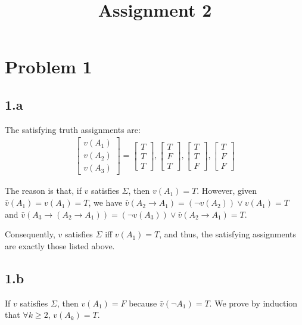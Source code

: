 \documentclass{article}
\title{\huge{\textbf{Assignment 2}}}
\author{\Chi{杨乐天}}
\date{}
\begin{document}
\maketitle

\section*{Problem 1}

\subsection*{1.a}

The satisfying truth assignments are:
\begin{align*}
\begin{bmatrix} v(A_1) \\ v(A_2) \\ v(A_3) \end{bmatrix}
=
\begin{bmatrix} T \\ T \\ T \end{bmatrix},
\begin{bmatrix} T \\ F \\ T \end{bmatrix},
\begin{bmatrix} T \\ T \\ F \end{bmatrix},
\begin{bmatrix} T \\ F \\ F \end{bmatrix}
\end{align*}

The reason is that, if $v$ satisfies $\Sigma$, then $v(A_1)=T$. However, given $\bar{v}(A_1)=v(A_1)=T$, we have $\bar{v}(A_2 \to A_1) = (\neg v(A_2)) \lor v(A_1)=T$ and $\bar{v}\left( A_3 \to \left( A_2 \to A_1 \right)\right) = (\neg v(A_3)) \lor \bar{v}(A_2 \to A_1) = T$.

Consequently, $v$ satisfies $\Sigma$ iff $v(A_1)=T$, and thus, the satisfying assignments are exactly those listed above.

\subsection*{1.b}

If $v$ satisfies $\Sigma$, then $v(A_1)=F$ because $\bar{v}(\neg A_1)=T$. We prove by induction that $\forall k \ge 2$, $v(A_k)=T$.
\end{document}
